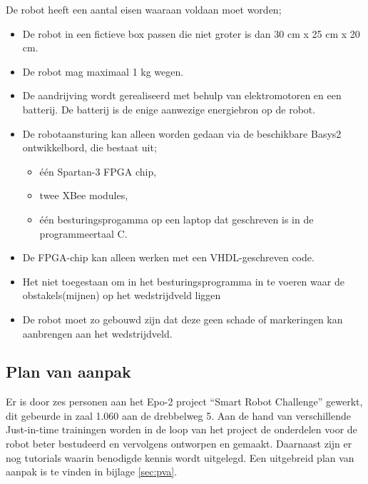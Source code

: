 \documentclass{report}
\begin{document}
De robot heeft een aantal eisen waaraan voldaan moet worden;

\begin{itemize}

\item
De robot in een fictieve box passen die niet groter is dan 30 cm x 25 cm x 20 cm.

\item
De robot mag maximaal 1 kg wegen.

\item
De aandrijving wordt gerealiseerd met behulp van elektromotoren en een batterij.
De batterij is de enige aanwezige energiebron op de robot.

\item
De robotaansturing kan alleen worden gedaan via de beschikbare Basys2 ontwikkelbord, die bestaat uit;

\begin{itemize}

\item
één Spartan-3 FPGA chip,

\item
twee XBee modules,

\item
één besturingsprogamma op een laptop dat geschreven is in de programmeertaal C.


\end{itemize}

\item
De FPGA-chip kan alleen werken met een VHDL-geschreven code.

\item
Het niet toegestaan om in het besturingsprogramma in te voeren waar de obstakels(mijnen) op het wedstrijdveld liggen 

\item
De robot moet zo gebouwd zijn dat deze geen schade of markeringen kan aanbrengen aan het wedstrijdveld.

\end{itemize}

\subsection{Plan van aanpak}

Er is door zes personen aan het Epo-2 project “Smart Robot Challenge” gewerkt, dit gebeurde in zaal 1.060 aan de drebbelweg 5.
Aan de hand van verschillende Just-in-time trainingen worden in de loop van het project de onderdelen voor de robot beter bestudeerd en vervolgens ontworpen en gemaakt.
Daarnaast zijn er nog tutorials waarin benodigde kennis wordt uitgelegd.
Een uitgebreid plan van aanpak is te vinden in bijlage \ref{sec:pva}.
\end{document}
